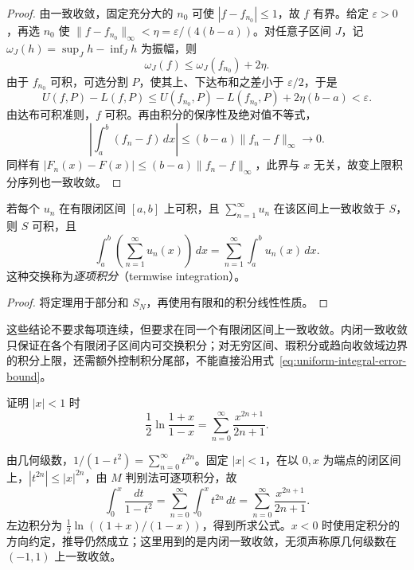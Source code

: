 \documentclass[UTF8,12pt,a4paper,fontset=fandol]{ctexbook}
\begin{document}
\begin{proof}
由一致收敛，固定充分大的 $n_0$ 可使 $|f-f_{n_0}|\leq1$，故 $f$ 有界。给定 $\varepsilon>0$，再选 $n_0$ 使 $\|f-f_{n_0}\|_\infty<\eta=\varepsilon/(4(b-a))$。对任意子区间 $J$，记 $\omega_J(h)=\sup_Jh-\inf_Jh$ 为振幅，则
\[
    \omega_J(f)\leq\omega_J(f_{n_0})+2\eta.
\]
由于 $f_{n_0}$ 可积，可选分割 $P$，使其上、下达布和之差小于 $\varepsilon/2$，于是
\[
    U(f,P)-L(f,P)
    \leq U(f_{n_0},P)-L(f_{n_0},P)+2\eta(b-a)<\varepsilon.
\]
由达布可积准则，$f$ 可积。再由积分的保序性及绝对值不等式，
\begin{equation}
    \left|\int_a^b(f_n-f)\,dx\right|
       \leq(b-a)\|f_n-f\|_\infty\longrightarrow0.
    \label{eq:uniform-integral-error-bound}
\end{equation}
同样有 $|F_n(x)-F(x)|\leq(b-a)\|f_n-f\|_\infty$，此界与 $x$ 无关，故变上限积分序列也一致收敛。
\end{proof}

\begin{corollary}[逐项积分]
\label{cor:termwise-integration-uniform-series}
若每个 $u_n$ 在有限闭区间 $[a,b]$ 上可积，且 $\sum_{n=1}^\infty u_n$ 在该区间上一致收敛于 $S$，则 $S$ 可积，且
\begin{equation}
    \int_a^b\left(\sum_{n=1}^\infty u_n(x)\right)\,dx
       =\sum_{n=1}^\infty\int_a^bu_n(x)\,dx.
    \label{eq:uniform-series-termwise-integration}
\end{equation}
这种交换称为\emph{逐项积分}（termwise integration）。
\end{corollary}

\begin{proof}
将定理用于部分和 $S_N$，再使用有限和的积分线性性质。
\end{proof}

这些结论不要求每项连续，但要求在同一个有限闭区间上一致收敛。内闭一致收敛只保证在各个有限闭子区间内可交换积分；对无穷区间、瑕积分或趋向收敛域边界的积分上限，还需额外控制积分尾部，不能直接沿用式~\eqref{eq:uniform-integral-error-bound}。

\begin{example}
\label{ex:logarithm-series-by-termwise-integration}
证明 $|x|<1$ 时
\begin{equation}
    \frac12\ln\frac{1+x}{1-x}
       =\sum_{n=0}^\infty\frac{x^{2n+1}}{2n+1}.
    \label{eq:logarithm-odd-power-series}
\end{equation}
\end{example}

\begin{solve}
由几何级数，$1/(1-t^2)=\sum_{n=0}^\infty t^{2n}$。固定 $|x|<1$，在以 $0,x$ 为端点的闭区间上，$|t^{2n}|\leq|x|^{2n}$，由 $M$ 判别法可逐项积分，故
\[
    \int_0^x\frac{dt}{1-t^2}
       =\sum_{n=0}^\infty\int_0^xt^{2n}\,dt
       =\sum_{n=0}^\infty\frac{x^{2n+1}}{2n+1}.
\]
左边积分为 $\frac12\ln((1+x)/(1-x))$，得到所求公式。$x<0$ 时使用定积分的方向约定，推导仍然成立；这里用到的是内闭一致收敛，无须声称原几何级数在 $(-1,1)$ 上一致收敛。
\end{solve}
\end{document}
